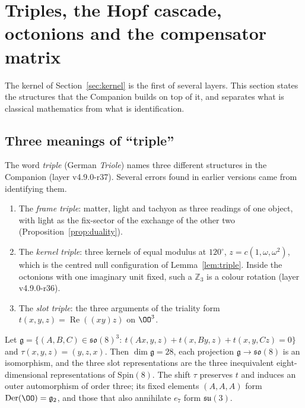 \section{Triples, the Hopf cascade, octonions and the compensator matrix}\label{sec:octonions}

The kernel of Section~\ref{sec:kernel} is the first of several layers.  This section states the structures that the Companion
builds on top of it, and separates what is classical mathematics from what is identification.

\subsection{Three meanings of ``triple''}

The word \emph{triple} (German \emph{Triole}) names three different structures in the Companion (layer v4.9.0-r37).  Several
errors found in earlier versions came from identifying them.
\begin{enumerate}[label=(\roman*)]
\item The \emph{frame triple}: matter, light and tachyon as three readings of one object, with light as the fix-sector of the
exchange of the other two (Proposition~\ref{prop:duality}).
\item The \emph{kernel triple}: three kernels of equal modulus at \(120^\circ\), \(z=c(1,\omega,\omega^2)\), which is the centred
null configuration of Lemma~\ref{lem:triple}.  Inside the octonions with one imaginary unit fixed, such a \(\mathbb Z_3\) is a colour
rotation (layer v4.9.0-r36).
\item The \emph{slot triple}: the three arguments of the triality form \(t(x,y,z)=\operatorname{Re}((xy)z)\) on \(\OO^3\).
\end{enumerate}

\begin{proposition}[Triality]\label{prop:triality}
Let \(\mathfrak g=\{(A,B,C)\in\mathfrak{so}(8)^3:\ t(Ax,y,z)+t(x,By,z)+t(x,y,Cz)=0\}\) and \(\tau(x,y,z)=(y,z,x)\).  Then
\(\dim\mathfrak g=28\), each projection \(\mathfrak g\to\mathfrak{so}(8)\) is an isomorphism, and the three slot representations are
the three inequivalent eight-dimensional representations of \(\mathrm{Spin}(8)\).  The shift \(\tau\) preserves \(t\) and induces an
outer automorphism of order three; its fixed elements \((A,A,A)\) form \(\operatorname{Der}(\OO)=\mathfrak g_2\), and those that
also annihilate \(e_7\) form \(\mathfrak{su}(3)\).
\end{proposition}

